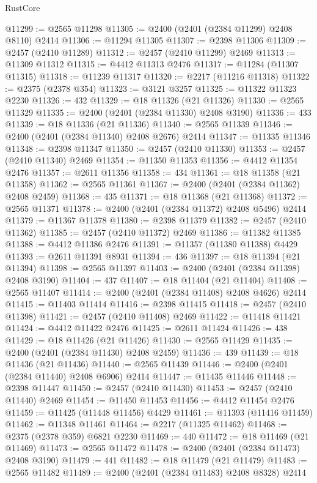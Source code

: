 \begin{lexlean}{RustCore}
\begin{coremodule}
@11299 := @2565 @11298
@11305 := @2400 (@2401 (@2384 @11299) @2408 @8110) @2414
@11306 := @11294 @11305
@11307 := @2398 @11306
@11309 := @2457 (@2410 @11289)
@11312 := @2457 (@2410 @11299) @2469
@11313 := @11309 @11312
@11315 := @4412 @11313 @2476
@11317 := @11284 (@11307 @11315)
@11318 := @11239 @11317
@11320 := @2217 (@11216 @11318)
@11322 := @2375 (@2378 @354)
@11323 := @3121 @3257
@11325 := @11322 @11323 @2230
@11326 := 432
@11329 := @18 @11326 (@21 @11326)
@11330 := @2565 @11329
@11335 := @2400 (@2401 (@2384 @11330) @2408 @3190)
@11336 := 433
@11339 := @18 @11336 (@21 @11336)
@11340 := @2565 @11339
@11346 := @2400 (@2401 (@2384 @11340) @2408 @2676) @2414
@11347 := @11335 @11346
@11348 := @2398 @11347
@11350 := @2457 (@2410 @11330)
@11353 := @2457 (@2410 @11340) @2469
@11354 := @11350 @11353
@11356 := @4412 @11354 @2476
@11357 := @2611 @11356
@11358 := 434
@11361 := @18 @11358 (@21 @11358)
@11362 := @2565 @11361
@11367 := @2400 (@2401 (@2384 @11362) @2408 @2459)
@11368 := 435
@11371 := @18 @11368 (@21 @11368)
@11372 := @2565 @11371
@11378 := @2400 (@2401 (@2384 @11372) @2408 @5496) @2414
@11379 := @11367 @11378
@11380 := @2398 @11379
@11382 := @2457 (@2410 @11362)
@11385 := @2457 (@2410 @11372) @2469
@11386 := @11382 @11385
@11388 := @4412 @11386 @2476
@11391 := @11357 (@11380 @11388) @4429
@11393 := @2611 @11391 @8931
@11394 := 436
@11397 := @18 @11394 (@21 @11394)
@11398 := @2565 @11397
@11403 := @2400 (@2401 (@2384 @11398) @2408 @3190)
@11404 := 437
@11407 := @18 @11404 (@21 @11404)
@11408 := @2565 @11407
@11414 := @2400 (@2401 (@2384 @11408) @2408 @4626) @2414
@11415 := @11403 @11414
@11416 := @2398 @11415
@11418 := @2457 (@2410 @11398)
@11421 := @2457 (@2410 @11408) @2469
@11422 := @11418 @11421
@11424 := @4412 @11422 @2476
@11425 := @2611 @11424
@11426 := 438
@11429 := @18 @11426 (@21 @11426)
@11430 := @2565 @11429
@11435 := @2400 (@2401 (@2384 @11430) @2408 @2459)
@11436 := 439
@11439 := @18 @11436 (@21 @11436)
@11440 := @2565 @11439
@11446 := @2400 (@2401 (@2384 @11440) @2408 @6906) @2414
@11447 := @11435 @11446
@11448 := @2398 @11447
@11450 := @2457 (@2410 @11430)
@11453 := @2457 (@2410 @11440) @2469
@11454 := @11450 @11453
@11456 := @4412 @11454 @2476
@11459 := @11425 (@11448 @11456) @4429
@11461 := @11393 (@11416 @11459)
@11462 := @11348 @11461
@11464 := @2217 (@11325 @11462)
@11468 := @2375 (@2378 @359) @6821 @2230
@11469 := 440
@11472 := @18 @11469 (@21 @11469)
@11473 := @2565 @11472
@11478 := @2400 (@2401 (@2384 @11473) @2408 @3190)
@11479 := 441
@11482 := @18 @11479 (@21 @11479)
@11483 := @2565 @11482
@11489 := @2400 (@2401 (@2384 @11483) @2408 @8328) @2414

\end{coremodule}
\end{lexlean}

